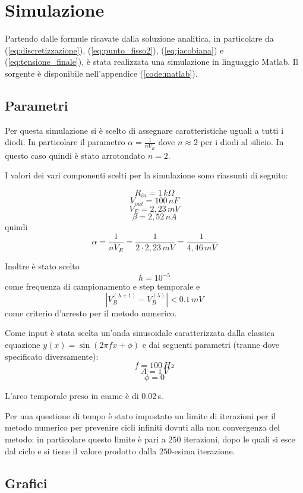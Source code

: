 \chapter{Simulazione}
	Partendo dalle formule ricavate dalla soluzione analitica, in particolare da (\ref{eq:discretizzazione}), (\ref{eq:punto_fisso2}), (\ref{eq:jacobiana}) e (\ref{eq:tensione_finale}), è stata realizzata una simulazione in linguaggio Matlab. Il sorgente è disponibile nell'appendice (\ref{code:matlab}).
	
	\section{Parametri}
		Per questa simulazione si è scelto di assegnare caratteristiche uguali a tutti i diodi. In particolare il parametro $\alpha = \frac{1}{nV_{E}}$ dove $n \approx 2$ per i diodi al silicio. In questo caso quindi è stato arrotondato $n = 2$.
	
		I valori dei vari componenti scelti per la simulazione sono riassunti di seguito:
	
		\[
			R_{in} = 1\,k\Omega
		\]
		\[
			V_{out} = 100\,nF
		\]
		\[
			V_{E} = 2,23\,mV
		\]
		\[
			\beta = 2,52\,nA
		\]
		quindi
		\[
			\alpha = \frac{1}{nV_{E}} = \frac{1}{2 \cdot 2,23\,mV} = \frac{1}{4,46\,mV}
		\]
	
		Inoltre è stato scelto
		\[
			h = 10^{-5}
		\]
		come frequenza di campionamento e step temporale e
		\[
			|V_{B}^{(\lambda+1)} - V_{B}^{(\lambda)}| < 0.1\,mV
		\]
		come criterio d'arresto per il metodo numerico.
	
		Come input è stata scelta un'onda sinusoidale caratterizzata dalla classica equazione $y(x) = \sin (2 \pi f x + \phi)$ e dai seguenti parametri (tranne dove specificato diversamente):
		\[
			f = 100\,Hz
		\]
		\[
			A = 1\,V
		\]
		\[
			\phi = 0
		\]
		
		\vspace{10px}
		L'arco temporale preso in esame è di 0.02\,s.
		
		Per una questione di tempo è stato impostato un limite di iterazioni per il metodo numerico per prevenire cicli infiniti dovuti alla non convergenza del metodo: in particolare questo limite è pari a $250$ iterazioni, dopo le quali si esce dal ciclo e si tiene il valore prodotto dalla $250$-esima iterazione.
	\pagebreak
	
	\section{Grafici}
